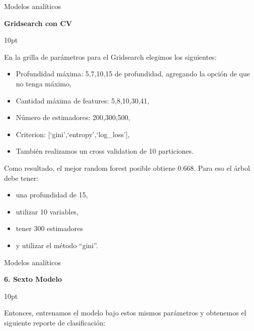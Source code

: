 \documentclass[pdf]{beamer}
\def\vspace{}%
\begin{document}
{\begin{frame}{Modelos analíticos}

    \begin{Large}
        \textbf{Gridsearch con CV}
    \end{Large}
    \vspace{10pt}

    En la grilla de parámetros para el Gridsearch elegimos los siguientes:
    \begin{itemize}
        \item Profundidad máxima: 5,7,10,15 de profundidad, agregando la opción de que no tenga máximo,
        \item Cantidad máxima de features: 5,8,10,30,41,
        \item Número de estimadores: 200,300,500,
        \item Criterion: [`gini',`entropy',`log\_loss'],
        \item También realizamos un cross validation de 10 particiones.
    \end{itemize}
    
    Como resultado, el mejor random forest posible obtiene 0.668. Para eso el árbol debe tener: 
    \begin{itemize}
        \item una profundidad de 15, 
        \item utilizar  10  variables, 
        \item tener  300  estimadores 
        \item y utilizar el método ``gini''.
    \end{itemize}

\end{frame}

\begin{frame}{Modelos analíticos}    

    \begin{Large}
        \textbf{6. Sexto Modelo}
    \end{Large}
    \vspace{10pt}

    Entonces, entrenamos el modelo bajo estos mismos parámetros y obtenemos el siguiente reporte de clasificación:
    

\end{frame}}
\end{document}
